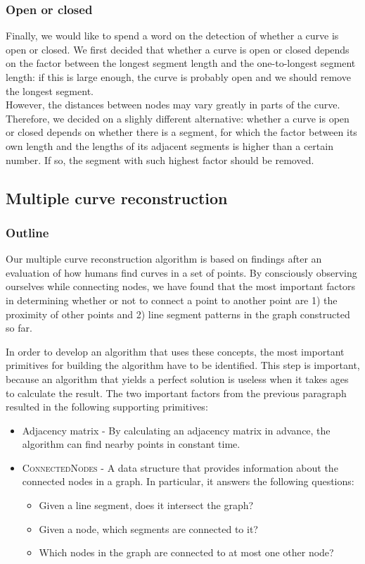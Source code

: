 \documentclass[11pt]{article}
\begin{document}
\subsubsection{Open or closed} 

Finally, we would like to spend a word on the detection of whether a curve is open or closed. We first decided that whether a curve is open or closed depends on the factor between the longest segment length and the one-to-longest segment length: if this is large enough, the curve is probably open and we should remove the longest segment.\\

However, the distances between nodes may vary greatly in parts of the curve. Therefore, we decided on a slighly different alternative: whether a curve is open or closed depends on whether there is a segment, for which the factor between its own length and the lengths of its adjacent segments is higher than a certain number. If so, the segment with such highest factor should be removed.\\

\subsection{Multiple curve reconstruction}

\subsubsection{Outline}
Our multiple curve reconstruction algorithm is based on findings after an evaluation of how humans find curves in a set of points. By consciously observing ourselves while connecting nodes, we have found that the most important factors in determining whether or not to connect a point to another point are 1) the proximity of other points and 2) line segment patterns in the graph constructed so far.

In order to develop an algorithm that uses these concepts, the most important primitives for building the algorithm have to be identified. This step is important, because an algorithm that yields a perfect solution is useless when it takes ages to calculate the result. The two important factors from the previous paragraph resulted in the following supporting primitives:

\begin{itemize}
\item Adjacency matrix - By calculating an adjacency matrix in advance, the algorithm can find nearby points in constant time.
\item \textsc{ConnectedNodes} - A data structure that provides information about the connected nodes in a graph. In particular, it answers the following questions:
\begin{itemize}
\item Given a line segment, does it intersect the graph?
\item Given a node, which segments are connected to it?
\item Which nodes in the graph are connected to at most one other node?
\end{itemize}
\end{itemize}
\end{document}

